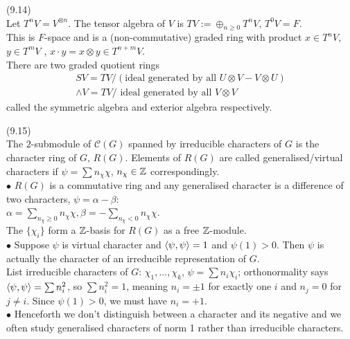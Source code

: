 \documentclass[a4paper]{article}
\begin{document}
\begin{defi} (9.14)\\
Let $T^n V = V^{\otimes n}$. The tensor algebra of $V$ is $TV := \oplus_{n \geq 0} T^n V$, $T^0 V = F$.\\
This is $F$-space and is a (non-commutative) graded ring with product $x \in T^n V$, $y \in T^m V$ , $x \cdot y = x \otimes y \in T^{n+m} V$.\\
There are two graded quotient rings
\begin{equation*}
\begin{aligned}
SV = TV /(\text{ideal generated by all } U \otimes V - V \otimes U)\\
\wedge V = TV / \text{ ideal generated by all }V \otimes V
\end{aligned}
\end{equation*}
called the symmetric algebra and exterior algebra respectively.
\end{defi}

\begin{defi} (9.15)\\
The $2$-submodule of $\mathcal{C}(G)$ spanned by irreducible characters of $G$ is the character ring of $G$, $R(G)$. Elements of $R(G)$ are called generalised/virtual characters if $\psi = \sum n_\chi \chi$, $n_\chi \in \mathbb{Z}$ correspondingly.\\
$\bullet$ $R(G)$ is a commutative ring and any generalised character is a difference of two characters, $\psi = \alpha - \beta$:\\
$\alpha = \sum_{n_\chi \geq 0} n_\chi \chi, \beta = -\sum_{n_\chi < 0} n_\chi \chi$.\\
The $\{\chi_i\}$ form a $\mathbb{Z}$-basis for $R(G)$ as a free $\mathbb{Z}$-module.\\
$\bullet$ Suppose $\psi$ is virtual character and $\langle\psi,\psi\rangle = 1$ and $\psi(1) > 0$. Then $\psi$ is actually the character of an irreducible representation of $G$.\\
List irreducible characters of $G$: $\chi_1,...,\chi_k$, $\psi = \sum n_i \chi_i$; orthonormality says $\langle\psi,\psi\rangle = \sum n_i^2$, so $\sum n_i^2 = 1$, meaning $n_i = \pm 1$ for exactly one $i$ and $n_j = 0$ for $j \neq i$. Since $\psi(1)>0$, we must have $n_i = +1$.\\
$\bullet$ Henceforth we don't distinguish between a character and its negative and we often study generalised characters of norm 1 rather than irreducible characters.
\end{defi}
\end{document}
